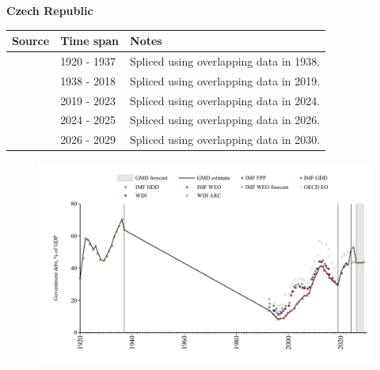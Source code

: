 \documentclass[12pt,a4paper,landscape]{article}
\begin{document}
\begin{adjustbox}{max totalsize={\paperwidth}{\paperheight},center}
\begin{minipage}[t][\textheight][t]{\textwidth}
\vspace*{0.5cm}
{}
\begin{center}
{\Large\bfseries Czech Republic}
\end{center}
\vspace{0.5cm}
\begin{table}[H]
\centering
\small
\begin{tabular}{|l|l|l|}
\hline
\textbf{Source} & \textbf{Time span} & \textbf{Notes} \\
\hline
\rowcolor{white}\cite{IMF_HDD}& 1920 - 1937 &Spliced using overlapping data in 1938.\\
\rowcolor{lightgray}\cite{IMF_GDD}& 1938 - 2018 &Spliced using overlapping data in 2019.\\
\rowcolor{white}\cite{IMF_FPP}& 2019 - 2023 &Spliced using overlapping data in 2024.\\
\rowcolor{lightgray}\cite{OECD_EO}& 2024 - 2025 &Spliced using overlapping data in 2026.\\
\rowcolor{white}\cite{IMF_WEO_forecast}& 2026 - 2029 &Spliced using overlapping data in 2030.\\
\hline
\end{tabular}
\end{table}
\begin{figure}[H]
\centering
\includegraphics[width=\textwidth,height=0.6\textheight,keepaspectratio]{graphs/CZE_govdebt_GDP.pdf}
\end{figure}
\end{minipage}
\end{adjustbox}
\end{document}
